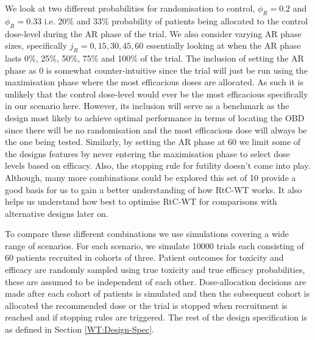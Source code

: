We look at two different probabilities for randomisation to control, $\phi_R = 0.2$ and $\phi_R = 0.33$ i.e. 20\% and 33\% probability of patients being allocated to the control dose-level during the AR phase of the trial. We also consider varying AR phase sizes, specifically $j_R = 0, 15, 30, 45 ,60$ essentially looking at when the AR phase lasts 0\%, 25\%, 50\%, 75\% and 100\% of the trial. The inclusion of setting the AR phase as 0 is somewhat counter-intuitive since the trial will just be run using the maximisation phase where the most efficacious doses are allocated. As such it is unlikely that the control dose-level would ever be the most efficacious specifically in our scenario here. However, its inclusion will serve as a benchmark as the design most likely to achieve optimal performance in terms of locating the OBD since there will be no randomisation and the most efficacious dose will always be the one being tested. Similarly, by setting the AR phase at 60 we limit some of the designs features by never entering the maximisation phase to select dose levels based on efficacy. Also, the stopping rule for futility doesn't come into play. Although, many more combinations could be explored this set of 10 provide a good basis for us to gain a better understanding of how RtC-WT works. It also helps us understand how best to optimise RtC-WT for comparisons with alternative designs later on.  

To compare these different combinations we use simulations covering a wide range of scenarios. For each scenario, we simulate 10000 trials each consisting of 60 patients recruited in cohorts of three. Patient outcomes for toxicity and efficacy are randomly sampled using true toxicity and true efficacy probabilities, these are assumed to be independent of each other. Dose-allocation decisions are made after each cohort of patients is simulated and then the subsequent cohort is allocated the recommended dose or the trial is stopped when recruitment is reached and if stopping rules are triggered. The rest of the design specification is as defined in Section \ref{WT:Design-Spec}. 

